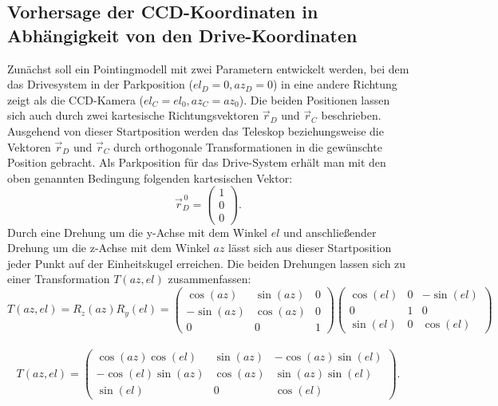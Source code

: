 \subsection{Vorhersage der CCD-Koordinaten in Abhängigkeit von den Drive-Koordinaten}
Zunächst soll ein Pointingmodell mit zwei Parametern entwickelt werden, bei dem das Drivesystem in der Parkposition ($el_D=0,az_D=0$) in eine andere Richtung zeigt als die CCD-Kamera ($el_C=el_0,az_C=az_0$). Die beiden Positionen lassen sich auch durch zwei kartesische Richtungsvektoren $\vec{r}_D$ und $\vec{r}_C$ beschrieben. Ausgehend von dieser Startposition werden das Teleskop beziehungsweise die Vektoren $\vec{r}_D$ und $\vec{r}_C$ durch orthogonale Transformationen in die gewünschte Position gebracht. Als Parkposition für das Drive-System erhält man mit den oben genannten Bedingung folgenden kartesischen Vektor:
\begin{equation}
\vec{r}_D^{\,0}=\left(\begin{array}{c} 1 \\ 0 \\ 0 \end{array}\right).
\label{eq:startDrive}
\end{equation}
Durch eine Drehung um die y-Achse mit dem Winkel $el$ und anschließender Drehung um die z-Achse mit dem Winkel $az$ lässt sich aus dieser Startposition jeder Punkt auf der Einheitskugel erreichen. Die beiden Drehungen lassen sich zu einer Transformation $T(az,el)$ zusammenfassen:
\begin{equation}
T(az,el)=R_z(az)R_y(el)=
\left(\begin{array}{ccc} \cos(az) & \sin(az) & 0 \\ -\sin(az) & \cos(az) & 0 \\ 0 & 0 & 1\end{array}\right)
\left(\begin{array}{ccc} \cos(el) & 0 &-\sin(el) \\0 & 1 & 0\\ \sin(el) & 0 & \cos(el) \end{array} \right)
\end{equation}\\
\begin{equation}
T(az,el)=\left(\begin{array}{ccc} \cos(az)\cos(el) & \sin(az) &-\cos(az)\sin(el) \\-\cos(el)\sin(az) & \cos(az) & \sin(az)\sin(el)\\ \sin(el) & 0 & \cos(el) \end{array} \right).
\label{eq:TransformMat}
\end{equation}\\
